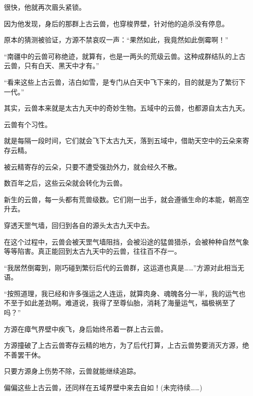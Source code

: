 \begin{this_body}
很快，他就再次眉头紧锁。

因为他发现，身后的那群上古云兽，也穿梭界壁，针对他的追杀没有停息。

原本的猜测被验证，方源不禁哀叹一声：“果然如此，我竟然如此倒霉啊！”

“南疆中的云兽可称绝迹，就算有，也是一两头的荒级云兽。这种成群结队的上古云兽，只有白天、黑天中才有。”

“看来这些上古云兽，洁白如雪，是专门从白天中飞下来的，目的就是为了繁衍下一代。”

其实，云兽本来就是太古九天中的奇妙生物。五域中的云兽，也都源自太古九天。

云兽有个习性。

就是每隔一段时间，它们就会飞下太古九天，落到五域中，借助天空中的云朵来寄存云精。

被云精寄存的云朵，只要不遭受强劲外力，就会经久不散。

数百年之后，这些云朵就会转化为云兽。

新生的云兽，每一头都有荒兽级数。它们刚一出手，就会遵循生命的本能，朝高空升去。

穿透天罡气墙，回归到各自的源头太古九天中去。

在这个过程中，云兽会被天罡气墙阻挡，会被沿途的猛兽猎杀，会被种种自然气象等等陷害。真正能回到太古九天中的云兽，往往百不存一。

“我居然倒霉到，刚巧碰到繁衍后代的云兽群，这运道也真是……”方源对此相当无语。

“按照道理，我已经和许多强运之人连运，就算肉身、魂魄各分一半，我的运气也不至于如此差劲啊。难道说，我得了至尊仙胎，消耗了海量运气，福极祸至了吗？”

方源在瘴气界壁中疾飞，身后始终吊着一群上古云兽。

方源撞破了上古云兽寄存云精的地方，为了后代打算，上古云兽势要消灭方源，绝不善罢干休。

只要方源身上伤势不除，云兽就能继续追踪。

偏偏这些上古云兽，还同样在五域界壁中来去自如！(未完待续……)

\end{this_body}

